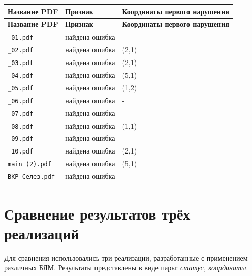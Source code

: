 \begin{longtable}{|p{}|p{}|p{}|}
\hline
\textbf{Название PDF} & \textbf{Признак} & \textbf{Координаты первого нарушения} \\
\hline
\endfirsthead
\hline
\textbf{Название PDF} & \textbf{Признак} & \textbf{Координаты первого нарушения} \\
\hline
\endhead

\texttt{\_01.pdf} & найдена ошибка & - \\ \hline
\texttt{\_02.pdf} & найдена ошибка & (2,1) \\ \hline
\texttt{\_03.pdf} & найдена ошибка & (2,1) \\ \hline
\texttt{\_04.pdf} & найдена ошибка & (5,1) \\ \hline
\texttt{\_05.pdf} & найдена ошибка & (1,2) \\ \hline
\texttt{\_06.pdf} & найдена ошибка & - \\ \hline
\texttt{\_07.pdf} & найдена ошибка & - \\ \hline
\texttt{\_08.pdf} & найдена ошибка & (1,1) \\ \hline
\texttt{\_09.pdf} & найдена ошибка & - \\ \hline
\texttt{\_10.pdf} & найдена ошибка & (2,1) \\ \hline
\texttt{main (2).pdf} & найдена ошибка & (5,1) \\ \hline
\texttt{ВКР Селез.pdf} & найдена ошибка & - \\ \hline

\end{longtable}

\section{Сравнение результатов трёх реализаций}

Для сравнения использовались три реализации, разработанные с применением различных БЯМ.
Результаты представлены в виде пары: \textit{статус, координаты}.


